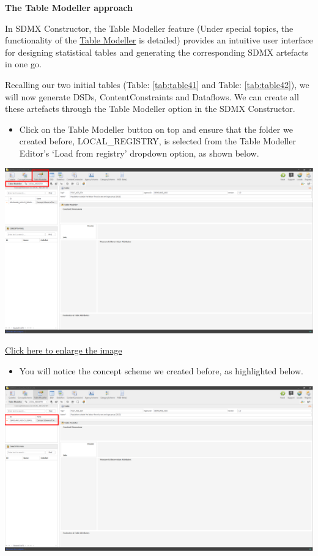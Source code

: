 \documentclass[
]{book}
\providecommand{\tightlist}{%
  \setlength{\itemsep}{0pt}\setlength{\parskip}{0pt}}
\begin{document}
\textbf{The Table Modeller approach}

In SDMX Constructor, the Table Modeller feature (Under special topics, the functionality of the \protect\hyperlink{table-modeller}{Table Modeller} is detailed) provides an intuitive user interface for designing statistical tables and generating the corresponding SDMX artefacts in one go.

Recalling our two initial tables (Table: \ref{tab:table41} and Table: \ref{tab:table42}), we will now generate DSDs, ContentConstraints and Dataflows. We can create all these artefacts through the Table Modeller option in the SDMX Constructor.

\begin{itemize}
\tightlist
\item
  Click on the Table Modeller button on top and ensure that the folder we created before, LOCAL\_REGISTRY, is selected from the Table Modeller Editor's `Load from registry' dropdown option, as shown below.
\end{itemize}

\begin{center}\includegraphics[width=1\linewidth]{./images/image130} \end{center}

\href{images/image130.png}{Click here to enlarge the image}

\begin{itemize}
\tightlist
\item
  You will notice the concept scheme we created before, as highlighted below.
\end{itemize}

\begin{center}\includegraphics[width=1\linewidth]{./images/image132} \end{center}
\end{document}
